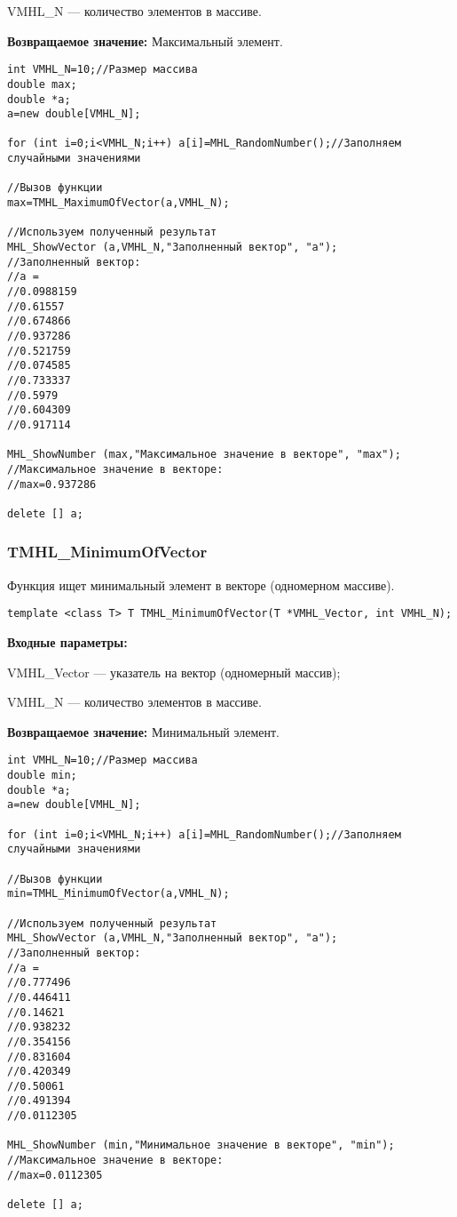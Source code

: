\documentclass[a4paper,12pt]{article}
\begin{document}
 VMHL\_N --- количество элементов в массиве.

\textbf{Возвращаемое значение:}
Максимальный элемент.


\begin{lstlisting}[label=code_use_TMHL_MaximumOfVector,caption=Пример использования]
int VMHL_N=10;//Размер массива
double max;
double *a;
a=new double[VMHL_N];

for (int i=0;i<VMHL_N;i++) a[i]=MHL_RandomNumber();//Заполняем случайными значениями

//Вызов функции
max=TMHL_MaximumOfVector(a,VMHL_N);

//Используем полученный результат
MHL_ShowVector (a,VMHL_N,"Заполненный вектор", "a");
//Заполненный вектор:
//a =
//0.0988159
//0.61557
//0.674866
//0.937286
//0.521759
//0.074585
//0.733337
//0.5979
//0.604309
//0.917114

MHL_ShowNumber (max,"Максимальное значение в векторе", "max");
//Максимальное значение в векторе:
//max=0.937286

delete [] a;
\end{lstlisting}

\subsubsection{TMHL\_MinimumOfVector}\label{TMHL_MinimumOfVector}

Функция ищет минимальный элемент в векторе (одномерном массиве).


\begin{lstlisting}[label=code_syntax_TMHL_MinimumOfVector,caption=Синтаксис]
template <class T> T TMHL_MinimumOfVector(T *VMHL_Vector, int VMHL_N);
\end{lstlisting}

\textbf{Входные параметры:}

 VMHL\_Vector --- указатель на вектор (одномерный массив);
 
 VMHL\_N --- количество элементов в массиве.

\textbf{Возвращаемое значение:}
Минимальный элемент.


\begin{lstlisting}[label=code_use_TMHL_MinimumOfVector,caption=Пример использования]
int VMHL_N=10;//Размер массива
double min;
double *a;
a=new double[VMHL_N];

for (int i=0;i<VMHL_N;i++) a[i]=MHL_RandomNumber();//Заполняем случайными значениями

//Вызов функции
min=TMHL_MinimumOfVector(a,VMHL_N);

//Используем полученный результат
MHL_ShowVector (a,VMHL_N,"Заполненный вектор", "a");
//Заполненный вектор:
//a =
//0.777496
//0.446411
//0.14621
//0.938232
//0.354156
//0.831604
//0.420349
//0.50061
//0.491394
//0.0112305

MHL_ShowNumber (min,"Минимальное значение в векторе", "min");
//Максимальное значение в векторе:
//max=0.0112305

delete [] a;
\end{lstlisting}
\end{document}
